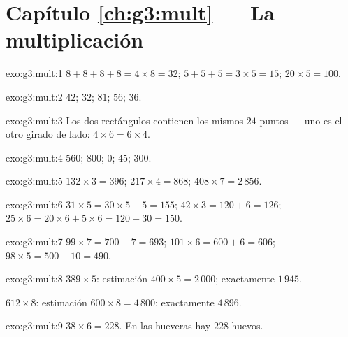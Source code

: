 \section*{Capítulo \ref{ch:g3:mult} --- La multiplicación}

\begin{solution}{exo:g3:mult:1}
$8 + 8 + 8 + 8 = 4 \times 8 = 32$; \quad
$5 + 5 + 5 = 3 \times 5 = 15$; \quad
$20 \times 5 = 100$.
\end{solution}

\begin{solution}{exo:g3:mult:2}
$42$; \quad $32$; \quad $81$; \quad $56$; \quad $36$.
\end{solution}

\begin{solution}{exo:g3:mult:3}
Los dos rectángulos contienen los mismos $24$ puntos --- uno es el otro
girado de lado: $4 \times 6 = 6 \times 4$.
\end{solution}

\begin{solution}{exo:g3:mult:4}
$560$; \quad $800$; \quad $0$; \quad $45$; \quad $300$.
\end{solution}

\begin{solution}{exo:g3:mult:5}
$132 \times 3 = 396$; \quad
$217 \times 4 = 868$; \quad
$408 \times 7 = 2\,856$.
\end{solution}

\begin{solution}{exo:g3:mult:6}
$31 \times 5 = 30 \times 5 + 5 = 155$; \quad
$42 \times 3 = 120 + 6 = 126$; \quad
$25 \times 6 = 20 \times 6 + 5 \times 6 = 120 + 30 = 150$.
\end{solution}

\begin{solution}{exo:g3:mult:7}
$99 \times 7 = 700 - 7 = 693$; \quad
$101 \times 6 = 600 + 6 = 606$; \quad
$98 \times 5 = 500 - 10 = 490$.
\end{solution}

\begin{solution}{exo:g3:mult:8}
$389 \times 5$: estimación $400 \times 5 = 2\,000$; exactamente
$1\,945$.

$612 \times 8$: estimación $600 \times 8 = 4\,800$; exactamente $4\,896$.
\end{solution}

\begin{solution}{exo:g3:mult:9}
$38 \times 6 = 228$. En las hueveras hay $228$ huevos.
\end{solution}

